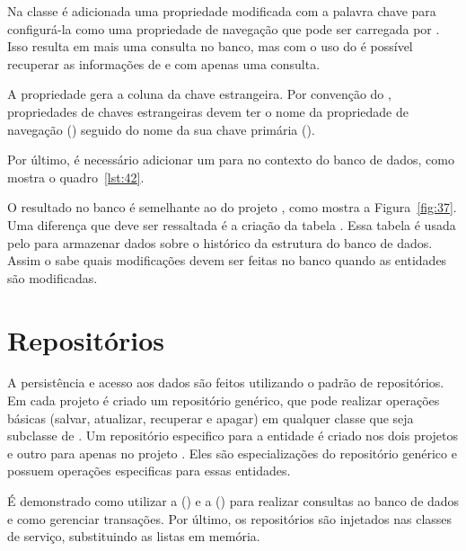 Na classe  é adicionada uma propriedade  modificada com a palavra chave  para configurá-la como uma propriedade de navegação que pode ser carregada por . Isso resulta em mais uma consulta no banco, mas com o uso do  é possível recuperar as informações de  e  com apenas uma consulta.

A propriedade  gera a coluna da chave estrangeira. Por convenção do , propriedades de chaves estrangeiras devem ter o nome da propriedade de navegação () seguido do nome da sua chave primária ().

Por último, é necessário adicionar um  para  no contexto do banco de dados, como mostra o quadro~\ref{lst:42}.


O resultado no banco é semelhante ao do projeto , como mostra a Figura~\ref{fig:37}. Uma diferença que deve ser ressaltada é a criação da tabela . Essa tabela é usada pelo  para armazenar dados sobre o histórico da estrutura do banco de dados. Assim o  sabe quais modificações devem ser feitas no banco quando as entidades são modificadas.


\section{Repositórios}

A persistência e acesso aos dados são feitos utilizando o padrão de repositórios. Em cada projeto é criado um repositório genérico, que pode realizar operações básicas (salvar, atualizar, recuperar e apagar) em qualquer classe que seja subclasse de . Um repositório especifico para a entidade  é criado nos dois projetos e outro para  apenas no projeto . Eles são especializações do repositório genérico e possuem operações especificas para essas entidades.

É demonstrado como utilizar a  () e a  () para realizar consultas ao banco de dados e como gerenciar transações. Por último, os repositórios são injetados nas classes de serviço, substituindo as listas em memória.

